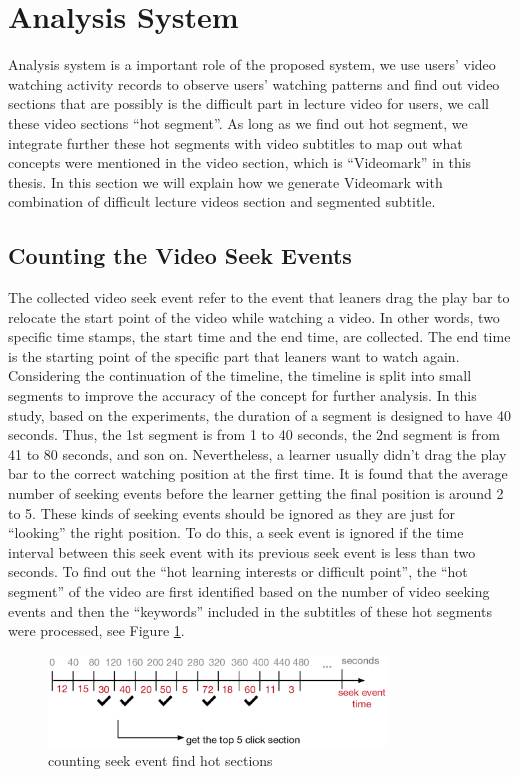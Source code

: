 \section{Analysis System}
Analysis system is a important role of the proposed system, we use users' video watching activity records to observe users' watching patterns and find out video sections that are possibly is the difficult part in lecture video for users, we call these video sections ``hot segment''.
As long as we find out hot segment, we integrate further these hot segments with video subtitles to map out what concepts were mentioned in the video section, which is ``Videomark'' in this thesis.
In this section we will explain how we generate Videomark with combination of difficult lecture videos section and segmented subtitle.

\subsection{Counting the Video Seek Events}
The collected video seek event refer to the event that leaners drag the play bar to relocate the start point of the video while watching a video. In other words, two specific time stamps, the start time and the end time, are collected. The end time is the starting point of the specific part that leaners want to watch again.
Considering the continuation of the timeline, the timeline is split into small segments to improve the accuracy of the concept for further analysis. In this study, based on the experiments, the duration of a segment is designed to have 40 seconds. Thus, the 1st segment is from 1 to 40 seconds, the 2nd segment is from 41 to 80 seconds, and son on.
Nevertheless, a learner usually didn’t drag the play bar to the correct watching position at the first time. It is found that the average number of seeking events before the learner getting the final position is around 2 to 5. These kinds of seeking events should be ignored as they are just for “looking” the right position. To do this, a seek event is ignored if the time interval between this seek event with its previous seek event is less than two seconds.
To find out the ``hot learning interests or difficult point'', the ``hot segment'' of the video are first identified based on the number of video seeking events and then the ``keywords'' included in the subtitles of these hot segments were processed, see Figure \ref{fig:countseek}.

\begin{figure}[H]
    \centering
    \includegraphics[width = 0.8\textwidth]{fig/countseek.eps}
    \caption{counting seek event find hot sections}
    \label{fig:countseek}
\end{figure}

